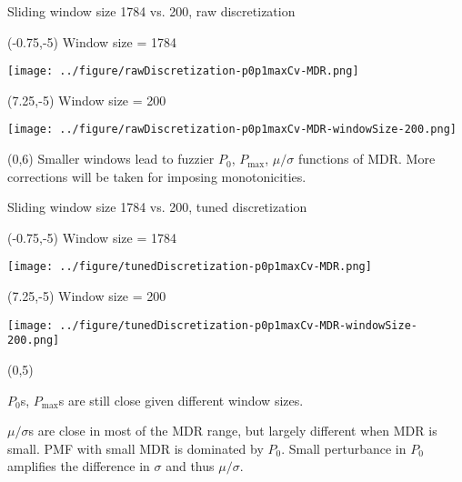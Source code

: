 \documentclass[aspectratio=169]{beamer}
\begin{document}
\begin{frame}{Sliding window size 1784 vs. 200, raw discretization}
\begin{textblock}{7.5}(-0.75,-5)
\centering Window size = 1784\medskip

\texttt{[image: ../figure/rawDiscretization-p0p1maxCv-MDR.png]}
\end{textblock}


\begin{textblock}{7.5}(7.25,-5)
\centering Window size = 200\medskip

\texttt{[image: ../figure/rawDiscretization-p0p1maxCv-MDR-windowSize-200.png]}
\end{textblock} 


\begin{textblock}{15}(0,6)
Smaller windows lead to fuzzier $P_0$, $P_{\max}$, $\mu/\sigma$ functions of MDR. More corrections will be taken for imposing monotonicities.

\end{textblock}
\end{frame}



\begin{frame}{Sliding window size 1784 vs. 200, tuned discretization}
\begin{textblock}{7.5}(-0.75,-5)
\centering Window size = 1784\medskip

\texttt{[image: ../figure/tunedDiscretization-p0p1maxCv-MDR.png]}
\end{textblock}


\begin{textblock}{7.5}(7.25,-5)
\centering Window size = 200\medskip

\texttt{[image: ../figure/tunedDiscretization-p0p1maxCv-MDR-windowSize-200.png]}
\end{textblock} 


\begin{textblock}{14}(0,5)

\scriptsize $P_0$s, $P_{\max}$s are still close given different window sizes.\medskip

\scriptsize $\mu/\sigma$s are close in most of the MDR range, but largely different when MDR is small. PMF with small MDR is dominated by $P_0$. Small perturbance in $P_0$ amplifies the difference in $\sigma$ and thus $\mu/\sigma$.

\end{textblock}
\end{frame}
\end{document}
